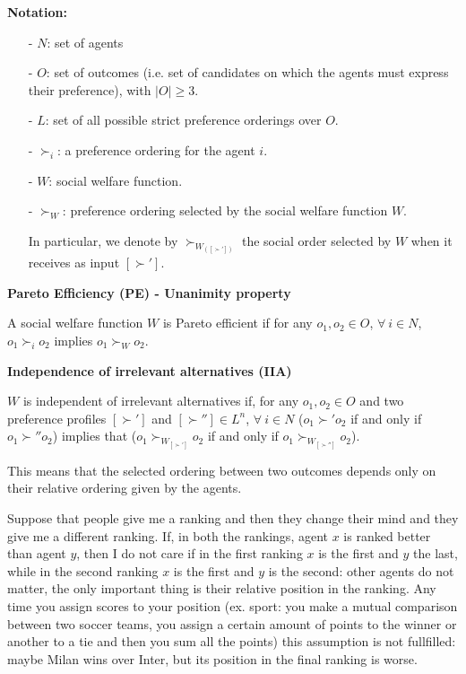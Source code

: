 %
%


\bigskip
\noindent \textbf{Notation:}
\begin{itemize}
	\item [-] $N$: set of agents
	\item [-] $O$: set of outcomes (i.e. set of candidates on which the agents 
	must express their preference), with $|O| \geq 3$.
	\item [-] $L$: set of all possible strict preference orderings over $O$.
	\item [-] $\succ_i$: a preference ordering for the agent $i$.
	\item [-] $W$: social welfare function.
	\item [-] $\succ_W$: preference ordering selected by the social welfare 
	function $W$.

	\noindent In particular, we denote by $\succ_{W_{([\succ'])}}$ the social 
	order selected by $W$ when it receives as input $[\succ']$.
\end{itemize}

\bigskip
\noindent \textbf{Pareto Efficiency (PE) - Unanimity property}

\noindent A social welfare function $W$ is Pareto efficient if for any $o_1, o_2 
\in O$, $\forall~i \in N$, $o_1 \succ_i o_2$ implies $o_1 \succ_W o_2$.

\bigskip
\noindent \textbf{Independence of irrelevant alternatives (IIA)}

\noindent $W$ is independent of irrelevant alternatives if, for any $o_1,o_2 
\in O$ and two preference profiles $[\succ']$ and $[\succ''] \in L^n$, 
$\forall~i \in N$ ($o_1 \succ' o_2$ if and only if $o_1 \succ'' o_2$) implies 
that ($o_1 \succ_{W_{[\succ']}} o_2$ if and only if $o_1 \succ_{W_{[\succ'']}} 
o_2$).

\bigskip
\noindent This means that the selected ordering between two outcomes depends 
only on their relative ordering given by the agents.

\noindent Suppose that 
people give me a ranking and then they change their mind and they give me a 
different ranking. If, in both the rankings, agent $x$ is ranked better than 
agent $y$, then I do not care if in the first ranking $x$ is the first and $y$ 
the last, while in the second ranking $x$ is the first and $y$ is the second: 
other agents do not matter, the only important thing is their relative position 
in the ranking. Any time you assign scores to your position (ex. sport: you make 
a mutual comparison between two soccer teams, you assign a certain amount 
of points to the winner or another to a tie and then you sum all the points) 
this assumption is not fullfilled: maybe Milan wins over Inter, but its position 
in the final ranking is worse.

